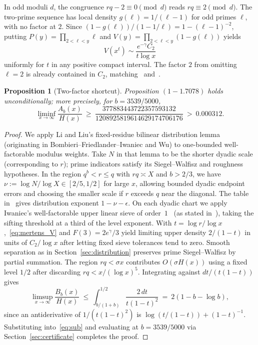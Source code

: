 \documentclass[11pt,reqno]{amsart}
\newtheorem{proposition}[theorem]{Proposition}
\theoremstyle{remark}
\numberwithin{equation}{section}
\begin{document}
In odd moduli $d$, the congruence $rq-2 \equiv 0 \pmod d$ reads $rq \equiv 2 \pmod d$. The two-prime sequence has local density $g(\ell) = 1/(\ell-1)$ for odd primes $\ell$, with no factor at $2$. Since $(1-g(\ell))/(1-1/\ell) = 1 - (\ell-1)^{-2}$, putting $P(y) = \prod_{2 < \ell < y}\ell$ and $V(y) = \prod_{2 < \ell < y}(1-g(\ell))$ yields
\begin{equation}\label{eq:mertens_V}
V(x^t) \sim \frac{e^{-\gamma}C_2}{t\log x}
\end{equation}
uniformly for $t$ in any positive compact interval. The factor $2$ from omitting $\ell=2$ is already contained in $C_2$, matching~\cite[(6.6)--(6.10)]{LiLiu2026} and~\cite[Corollary~1.4]{Pascadi2025}.

\begin{proposition}[Two-factor shortcut]\label{prop:shortcut}
Proposition $(1-1.7078)$ holds unconditionally; more precisely, for $b = 3539/5000$,
\[
\liminf_{x\to\infty}\frac{A_b(x)}{H(x)}
\ \ge\ \frac{377883443722357593132}{1208925819614629174706176}
\ >\ 0.000312.
\]
\end{proposition}

\begin{proof}
We apply Li and Liu's fixed-residue bilinear distribution lemma~\cite[Lemma~3.4]{LiLiu2026} (originating in Bombieri--Friedlander--Iwaniec and Wu) to one-bounded well-factorable modulus weights. Take $N$ in that lemma to be the shorter dyadic scale (corresponding to $r$); prime indicators satisfy its Siegel--Walfisz and roughness hypotheses. In the region $q^b < r \le q$ with $rq \asymp X$ and $b > 2/3$, we have $\nu := \log N/\log X \in [2/5, 1/2]$ for large $x$, allowing bounded dyadic endpoint errors and choosing the smaller scale if $r$ exceeds $q$ near the diagonal. The table in~\cite[Lemma~3.4]{LiLiu2026} gives distribution exponent $1 - \nu - \epsilon$. On each dyadic chart we apply Iwaniec's well-factorable upper linear sieve of order~$1$~\cite{Iwaniec1980b} (as stated in~\cite[Lemma~2.5]{LiLiu2026}), taking the sifting threshold at a third of the level exponent. With $t = \log r/\log x$,~\eqref{eq:mertens_V} and $F(3) = 2e^\gamma/3$ yield limiting upper density $2/(1-t)$ in units of $C_2/\log x$ after letting fixed sieve tolerances tend to zero. Smooth separation as in Section~\ref{sec:distribution} preserves prime Siegel--Walfisz by partial summation. The region $rq < \sigma x$ contributes $O(\sigma H(x))$ using a fixed level $1/2$ after discarding $rq < x/(\log x)^5$. Integrating against $dt/(t(1-t))$ gives
\[
\limsup_{x\to\infty}\frac{B_b(x)}{H(x)}
\ \le\ \int_{b/(1+b)}^{1/2}\frac{2\,dt}{t(1-t)^2}
\ =\ 2(1 - b - \log b),
\]
since an antiderivative of $1/(t(1-t)^2)$ is $\log(t/(1-t)) + (1-t)^{-1}$. Substituting into~\eqref{eq:sub} and evaluating at $b = 3539/5000$ via Section~\ref{sec:certificate} completes the proof.
\end{proof}
\end{document}
